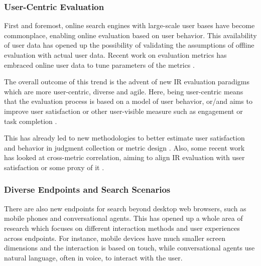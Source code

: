 \subsubsection{User-Centric Evaluation}
First and foremost, online search engines with large-scale user bases have become commonplace, enabling online evaluation based on user behavior. This availability of user data has opened up the possibility of validating the assumptions of offline evaluation with actual user data. Recent work on evaluation metrics has embraced online user data to tune parameters of the metrics \citep[for example]{CarteretteKY11, Carterette:2012,smucker12stochastic,YilmazSCR10}.

The overall outcome of this trend is the advent of new IR evaluation paradigms which are more user-centric, diverse and agile. Here, being user-centric means that the evaluation process is based on a model of user behavior, or/and aims to improve user satisfaction or other user-visible measure such as engagement or task completion \citep{scholer13}. 

This has already led to new methodologies to better estimate user satisfaction and behavior in judgment collection \citep{VermaY16, VermaYC16} or metric design \citep{YilmazSCR10, CarteretteKY11, ChapelleMZG09}. Also, some recent work has looked at cross-metric correlation, aiming to align IR evaluation with user satisfaction or some proxy of it \citep{Al-Maskari2007,radl:comp10}.


\subsubsection{Diverse Endpoints and Search Scenarios}

There are also new endpoints for search beyond desktop web browsers, such as mobile phones and conversational agents. This has opened up a whole area of research which focuses on different interaction methods and user experiences across endpoints. For instance, mobile devices have much smaller screen dimensions and the interaction is based on touch, while conversational agents use natural language, often in voice, to interact with the user.


